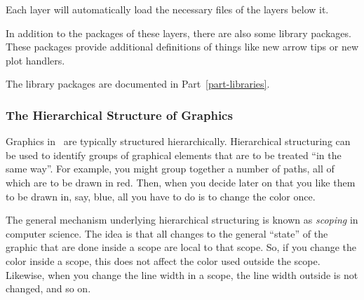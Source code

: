 Each layer will automatically load the necessary files of the layers below it.

In addition to the packages of these layers, there are also some library
packages. These packages provide additional definitions of things like new
arrow tips or new plot handlers.

The library packages are documented in Part~\ref{part-libraries}.


\subsubsection{The Hierarchical Structure of Graphics}

Graphics in \pgfname\ are typically structured hierarchically. Hierarchical
structuring can be used to identify groups of graphical elements that are to be
treated ``in the same way''. For example, you might group together a number of
paths, all of which are to be drawn in red. Then, when you decide later on that
you like them to be drawn in, say, blue, all you have to do is to change the
color once.

The general mechanism underlying hierarchical structuring is known as
\emph{scoping} in computer science. The idea is that all changes to the general
``state'' of the graphic that are done inside a scope are local to that scope.
So, if you change the color inside a scope, this does not affect the color used
outside the scope. Likewise, when you change the line width in a scope, the
line width outside is not changed, and so on.

